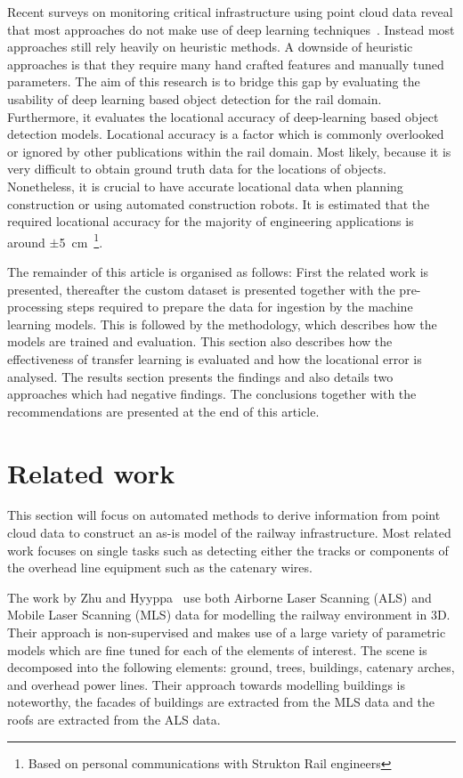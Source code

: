 Recent surveys on monitoring critical infrastructure using point cloud data reveal that most approaches do not make use of deep learning techniques~\cite{Sharifisoraki23, dekker23}. Instead most approaches still rely heavily on heuristic methods. A downside of heuristic approaches is that they require many hand crafted features and manually tuned parameters. The aim of this research is to bridge this gap by evaluating the usability of deep learning based object detection for the rail domain. Furthermore, it evaluates the locational accuracy of deep-learning based object detection models. Locational accuracy is a factor which is commonly overlooked or ignored by other publications within the rail domain. Most likely, because it is very difficult to obtain ground truth data for the locations of objects. Nonetheless, it is crucial to have accurate locational data when planning construction or using automated construction robots. It is estimated that the required locational accuracy for the majority of engineering applications is around $\pm$5~cm~\footnote{Based on personal communications with Strukton Rail engineers}.

The remainder of this article is organised as follows: First the related work is presented, thereafter the custom dataset is presented together with the pre-processing steps required to prepare the data for ingestion by the machine learning models. This is followed by the methodology, which describes how the models are trained and evaluation. This section also describes how the effectiveness of transfer learning is evaluated and how the locational error is analysed. The results section presents the findings and also details two approaches which had negative findings. The conclusions together with the recommendations are presented at the end of this article.

\section{Related work}
This section will focus on automated methods to derive information from point cloud data to construct an as-is model of the railway infrastructure. Most related work focuses on single tasks such as detecting either the tracks or components of the overhead line equipment such as the catenary wires.

The work by Zhu and Hyyppa~\cite{zhu2014the} use both Airborne Laser Scanning (ALS) and Mobile Laser Scanning (MLS) data for modelling the railway environment in 3D. Their approach is non-supervised and makes use of a large variety of parametric models which are fine tuned for each of the elements of interest. The scene is decomposed into the following elements: ground, trees, buildings, catenary arches, and overhead power lines. Their approach towards modelling buildings is noteworthy, the facades of buildings are extracted from the MLS data and the roofs are extracted from the ALS data.

